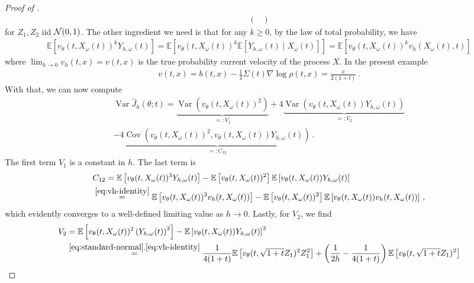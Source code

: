 \documentclass[oneside,11pt]{article}
\theoremstyle{remark}
\begin{document}
\begin{proof}[Proof of ]
\begin{align}
\begin{pmatrix}
    \end{pmatrix} 
    \label{eq:standard-normal}
\end{align}
for $Z_1, Z_2$ iid ${\cal N}(0,1)$. The other ingredient we need is that for any $k \geq 0$, by the law of total probability, we have 
\begin{align}
    \mathbb{E} \left[v_\theta(t, X_\omega(t))^k Y_{h,\omega}(t) \right] = \mathbb{E} \left[v_\theta(t, X_\omega(t))^k \mathbb{E} \left[ Y_{h,\omega}(t) \mid X_\omega(t) \right]\right]  = \mathbb{E} \left[v_\theta(t, X_\omega(t))^k v_h(X_\omega(t), t)\right] \label{eq:vh-identity}
\end{align}
where $\lim_{h \to 0} v_h(t,x) = v(t,x)$ is the true probability current velocity of the process $X$. In the present example
\begin{align*}
    v(t,x) = b(t,x) - \frac{1}{2} \Sigma(t) \nabla \log \rho(t,x) = \frac{x}{2(1+t)}\,.
\end{align*}
With that, we can now compute
\begin{align*}
   \operatorname{Var} \widehat{J}_h(\theta;t) = \underbrace{\operatorname{Var}\left(v_\theta(t, X_\omega(t))^2 \right)}_{=:V_1} + 4\underbrace{\operatorname{Var}\left(v_\theta(t, X_\omega(t)) Y_{h,\omega}(t) \right)}_{=:V_2} \\
   - 4 \underbrace{\operatorname{Cov}\left(v_\theta(t, X_\omega(t))^2,v_\theta(t, X_\omega(t))Y_{h,\omega}(t) \right)}_{=:C_{12}}\,.
\end{align*}
The first term $V_1$ is a constant in $h$. The last term is
\begin{align*}
    &C_{12} = \mathbb{E}\left[v_{\theta}(t, X_\omega(t))^3 Y_{h,\omega}(t) \right] - \mathbb{E}\left[v_\theta(t, X_\omega(t))^2 \right] \mathbb{E}\left[v_\theta(t, X_\omega(t)) Y_{h,\omega}(t) \right]\\
    &\overset{\eqref{eq:vh-identity}}{=}\mathbb{E}\left[v_{\theta}(t, X_\omega(t))^3 v_h(t, X_\omega(t)) \right] - \mathbb{E}\left[v_\theta(t, X_\omega(t))^2 \right] \mathbb{E}\left[v_\theta(t, X_\omega(t)) v_h(t, X_\omega(t)) \right]\,,
\end{align*}
which evidently converges to a well-defined limiting value as $h \to 0$. Lastly, for $V_2$, we find
\begin{align*}
    V_2 &= \mathbb{E} \left[v_\theta(t, X_\omega(t))^2 \left(Y_{h,\omega}(t) \right)^2 \right] - \mathbb{E} \left[ v_\theta(t, X_\omega(t)) Y_{h,\omega}(t) \right]^2\\
    &\overset{\eqref{eq:standard-normal},\eqref{eq:vh-identity}}{=} \frac{1}{4(1+t)} \mathbb{E} \left[v_\theta(t, \sqrt{1+t} Z_1)^2 Z_1^2 \right] + \left(\frac{1}{2 h} - \frac{1}{4(1+t)} \right) \mathbb{E} \left[v_\theta(t, \sqrt{1+t} Z_1)^2 \right]\\

\end{align*}
\end{proof}
\end{document}
